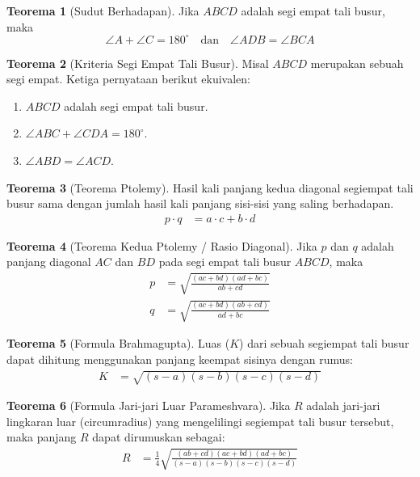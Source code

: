 \documentclass[aspectratio=169]{beamer}
\theoremstyle{definition}
\newtheorem{teorema}{Teorema}
\begin{document}
\begin{frame}{\insertsection}
  \begin{teorema}[Sudut Berhadapan]
    Jika $ABCD$ adalah segi empat tali busur, maka
    \[
      \angle A + \angle C = 180^\circ
      \quad \text{dan} \quad
      \angle ADB = \angle BCA
    \]
  \end{teorema}

  \begin{teorema}[Kriteria Segi Empat Tali Busur]
    Misal $ABCD$ merupakan sebuah segi empat. Ketiga pernyataan berikut ekuivalen:
    \begin{enumerate}
      \item $ABCD$ adalah segi empat tali busur.
      \item $\angle ABC + \angle CDA = 180^\circ$.
      \item $\angle ABD = \angle ACD$.
    \end{enumerate}
  \end{teorema}
\end{frame}

\begin{frame}{\insertsection}
  \begin{teorema}[Teorema Ptolemy]
    Hasil kali panjang kedua diagonal segiempat tali busur sama dengan jumlah hasil kali panjang sisi-sisi yang saling berhadapan.
    \begin{align*}
      p \cdot q & = a \cdot c + b \cdot d
    \end{align*}
  \end{teorema}

  \begin{teorema}[Teorema Kedua Ptolemy / Rasio Diagonal]
    Jika $p$ dan $q$ adalah panjang diagonal $AC$ dan $BD$ pada segi empat tali busur $ABCD$, maka
    \begin{align*}
      p & = \sqrt{\frac{(ac + bd)(ad + bc)}{ab + cd}} \\
      q & = \sqrt{\frac{(ac + bd)(ab + cd)}{ad + bc}}
    \end{align*}
  \end{teorema}
\end{frame}

\begin{frame}{\insertsection}
  \begin{teorema}[Formula Brahmagupta]
    Luas ($K$) dari sebuah segiempat tali busur dapat dihitung menggunakan panjang keempat sisinya dengan rumus:
    \begin{align*}
      K & = \sqrt{(s - a)(s - b)(s - c)(s - d)}
    \end{align*}
  \end{teorema}

  \begin{teorema}[Formula Jari-jari Luar Parameshvara]
    Jika $R$ adalah jari-jari lingkaran luar (circumradius) yang mengelilingi segiempat tali busur tersebut, maka panjang $R$ dapat dirumuskan sebagai:
    \begin{align*}
      R & = \frac{1}{4} \sqrt{\frac{(ab + cd)(ac + bd)(ad + bc)}{(s - a)(s - b)(s - c)(s - d)}}
    \end{align*}
  \end{teorema}
\end{frame}
\end{document}
